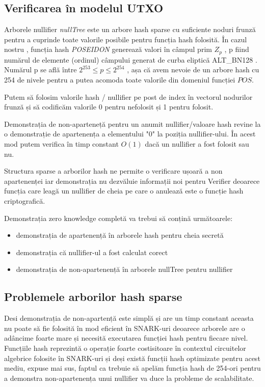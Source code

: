 \documentclass[12pt, letterpaper]{article}
\begin{document}
\subsection{Verificarea în modelul UTXO }
Arborele nullifier \emph{nullTree} este un arbore hash sparse cu suficiente noduri frunză pentru a cuprinde toate valorile posibile pentru funcția hash folosită. În cazul nostru , funcția hash \emph{POSEIDON} generează valori în câmpul prim $Z_p$ , p fiind numărul de elemente (ordinul) câmpului generat de curba eliptică ALT\_BN128 \cite{eip196}. Numărul p se află între $2^{253}\leq p\leq 2^{254}$ , așa că avem nevoie de un arbore hash cu 254 de nivele pentru a putea acomoda toate valorile din domeniul funcției $POS$.

Putem să folosim valorile hash / nullifier pe post de index în vectorul nodurilor frunză și să codificăm valorile 0 pentru nefolosit și 1 pentru folosit.

Demonstrația de non-aparteneță pentru un anumit nullifier/valoare hash revine la o demonstrație de apartenența a elementului "0" la poziția nullifier-ului. În acest mod putem verifica în timp constant \emph{$O(1)$} dacă un nullifier a fost folosit sau nu. 

Structura sparse a arborilor hash ne permite o verificare ușoară a non apartenenței iar demonstrația nu dezvăluie informații noi pentru Verifier deoarece funcția care leagă un nullifier de cheia pe care o anulează este o funcție hash criptografică.

Demonstrația zero knowledge completă va trebui să conțină următoarele:
\begin{itemize}
    \item{demonstrația de apartenență în arborele hash pentru cheia secretă}
    \item{demonstrația că nullifier-ul a fost calculat corect}
    \item{demonstrația de non-apartenență în arborele nullTree pentru nullifier}
\end{itemize}

\subsection{Problemele arborilor hash sparse}

Desi demonstrația de non-apartență este simplă și are un timp constant aceasta nu poate să fie folosită în mod eficient în SNARK-uri deoarece arborele are o adâncime foarte mare și necesită executarea funcției hash pentru fiecare nivel. Funcțiile hash reprezintă o operație foarte costisitoare în contextul circuitelor algebrice folosite în SNARK-uri și deși există funcții hash optimizate pentru acest mediu, expuse mai sus, faptul ca trebuie să apelăm funcția hash de 254-ori pentru a demonstra non-apartenența unui nullifier va duce la probleme de scalabilitate.
\end{document}
